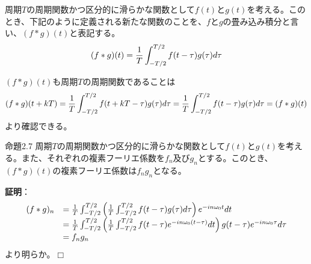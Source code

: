 \documentclass[dvipdfmx, 9pt, a4paper]{jsarticle}
\def\qed{\hfill $\Box$}
\begin{document}
\begin{tcolorbox}[title=畳み込み積分]
周期$T$の周期関数かつ区分的に滑らかな関数として$f(t)$と$g(t)$を考える。このとき、下記のように定義される新たな関数のことを、$f$と$g$の畳み込み積分と言い、$(f*g)(t)$と表記する。
\begin{equation}
(f*g)(t)=\frac{1}{T}\int_{-T/2}^{T/2}f(t-\tau)g(\tau)d\tau \notag
\end{equation}
\end{tcolorbox}
$(f*g)(t)$も周期$T$の周期関数であることは
\begin{equation}
(f*g)(t+kT)=\frac{1}{T}\int_{-T/2}^{T/2}f(t+kT-\tau)g(\tau) d\tau=\frac{1}{T}\int_{-T/2}^{T/2}f(t-\tau)g(\tau)d\tau=(f*g)(t) \notag
\end{equation}
より確認できる。
\begin{itembox}[l]{命題2.7}
周期$T$の周期関数かつ区分的に滑らかな関数として$f(t)$と$g(t)$を考える。また、それぞれの複素フーリエ係数を$f_n$及び$g_n$とする。このとき、$(f*g)(t)$の複素フーリエ係数は$f_ng_n$となる。
\end{itembox}
{\bf 証明}：
\begin{equation}
\begin{array}{ll}
(f*g)_n & =\frac{1}{T}\int_{-T/2}^{T/2}\left(\frac{1}{T}\int_{-T/2}^{T/2}f(t-\tau)g(\tau)d\tau \right)e^{-in\omega_0t}dt \\
&=\frac{1}{T}\int_{-T/2}^{T/2}\left(\frac{1}{T}\int_{-T/2}^{T/2}f(t-\tau)e^{-in\omega_0(t-\tau)}dt \right)g(t-\tau)e^{-in\omega_0\tau}d\tau \\
& =f_ng_n
\end{array}\notag
\end{equation}
より明らか。\qed
\end{document}
